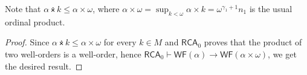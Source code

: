 \documentclass{article}
\numberwithin{theorem}{section}
\newtheorem{lemma}[theorem]{Lemma}
\newcommand{\RCA}{\mathsf{RCA}}
\newcommand{\BSig}{\mathsf{B}\Sigma^0}
\newcommand{\WF}{\mathsf{WF}}
\newcommand{\RT}{\mathsf{RT}}
\newcommand{\M}{\mathcal{M}}
\newcommand{\ntimes}{\dottimes}
\begin{document}
Note that $\alpha \ntimes k \leq \alpha \times \omega$, where $\alpha \times \omega = \sup_{k < \omega} \alpha \times k = \omega^{\gamma_1 + 1}n_1$ is the usual ordinal product.


\begin{proof}
Since $\alpha \ntimes k \leq \alpha \times \omega$ for every $k \in M$ and $\RCA_0$ proves that the product of two well-orders is a well-order, hence $\RCA_0 \vdash \WF(\alpha) \rightarrow \WF(\alpha \times \omega)$, we get the desired result.



\end{proof}
\end{document}
